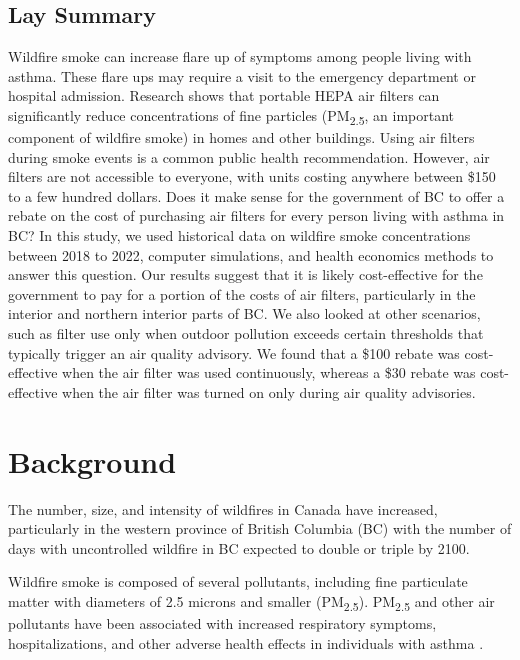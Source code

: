 \documentclass[
  number]{elsarticle}
\begin{document}
\hypertarget{lay-summary}{%
\subsection{Lay Summary}\label{lay-summary}}

Wildfire smoke can increase flare up of symptoms among people living
with asthma. These flare ups may require a visit to the emergency
department or hospital admission. Research shows that portable HEPA air
filters can significantly reduce concentrations of fine particles
(PM\textsubscript{2.5}, an important component of wildfire smoke) in
homes and other buildings. Using air filters during smoke events is a
common public health recommendation. However, air filters are not
accessible to everyone, with units costing anywhere between \$150 to a
few hundred dollars. Does it make sense for the government of BC to
offer a rebate on the cost of purchasing air filters for every person
living with asthma in BC? In this study, we used historical data on
wildfire smoke concentrations between 2018 to 2022, computer
simulations, and health economics methods to answer this question. Our
results suggest that it is likely cost-effective for the government to
pay for a portion of the costs of air filters, particularly in the
interior and northern interior parts of BC. We also looked at other
scenarios, such as filter use only when outdoor pollution exceeds
certain thresholds that typically trigger an air quality advisory. We
found that a \$100 rebate was cost-effective when the air filter was
used continuously, whereas a \$30 rebate was cost-effective when the air
filter was turned on only during air quality advisories.

\hypertarget{background}{%
\section{Background}\label{background}}

The number, size, and intensity of wildfires in Canada have increased,
particularly in the western province of British Columbia (BC) with the
number of days with uncontrolled wildfire in BC expected to double or
triple by 2100\citep{wotton2017}.

Wildfire smoke is composed of several pollutants, including fine
particulate matter with diameters of 2.5 microns and smaller
(PM\textsubscript{2.5}). PM\textsubscript{2.5} and other air pollutants
have been associated with increased respiratory symptoms,
hospitalizations, and other adverse health effects in individuals with
asthma \citep{reid2016}.
\end{document}
